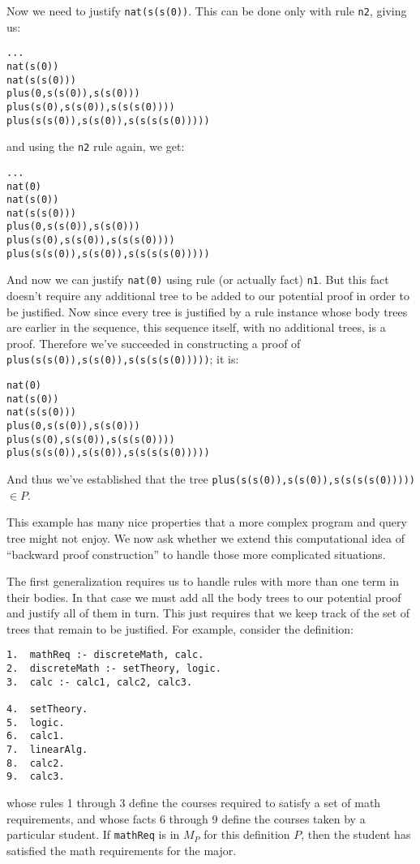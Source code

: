 Now we need to justify \verb|nat(s(s(0))|.  This can be done only with
rule {\tt n2}, giving us:
\begin{verbatim}
...
nat(s(0))
nat(s(s(0)))
plus(0,s(s(0)),s(s(0)))
plus(s(0),s(s(0)),s(s(s(0))))
plus(s(s(0)),s(s(0)),s(s(s(s(0)))))
\end{verbatim}
and using the {\tt n2} rule again, we get:
\begin{verbatim}
...
nat(0)
nat(s(0))
nat(s(s(0)))
plus(0,s(s(0)),s(s(0)))
plus(s(0),s(s(0)),s(s(s(0))))
plus(s(s(0)),s(s(0)),s(s(s(s(0)))))
\end{verbatim}
And now we can justify \verb|nat(0)| using rule (or actually fact)
{\tt n1}.  But this fact doesn't require any additional tree to be
added to our potential proof in order to be justified.  Now since
every tree is justified by a rule instance whose body trees are
earlier in the sequence, this sequence itself, with no additional
trees, is a proof.  Therefore we've succeeded in constructing a proof
of \verb|plus(s(s(0)),s(s(0)),s(s(s(s(0)))))|; it is:
\begin{verbatim}
nat(0)
nat(s(0))
nat(s(s(0)))
plus(0,s(s(0)),s(s(0)))
plus(s(0),s(s(0)),s(s(s(0))))
plus(s(s(0)),s(s(0)),s(s(s(s(0)))))
\end{verbatim}
And thus we've established that the tree
\verb|plus(s(s(0)),s(s(0)),s(s(s(s(0)))))| $\in P$.

This example has many nice properties that a more complex program and
query tree might not enjoy.  We now ask whether we extend this
computational idea of ``backward proof construction'' to handle those
more complicated situations.

The first generalization requires us to handle rules with more than
one term in their bodies.  In that case we must add all the body trees
to our potential proof and justify all of them in turn.  This just
requires that we keep track of the set of trees that remain to be
justified.  For example, consider the definition:
\begin{verbatim}
1.  mathReq :- discreteMath, calc.
2.  discreteMath :- setTheory, logic.
3.  calc :- calc1, calc2, calc3.

4.  setTheory.
5.  logic.
6.  calc1.
7.  linearAlg.
8.  calc2.
9.  calc3.
\end{verbatim}
whose rules 1 through 3 define the courses required to satisfy a set
of math requirements, and whose facts 6 through 9 define the courses
taken by a particular student.  If {\tt mathReq} is in $M_P$ for this
definition $P$, then the student has satisfied the math requirements
for the major.

